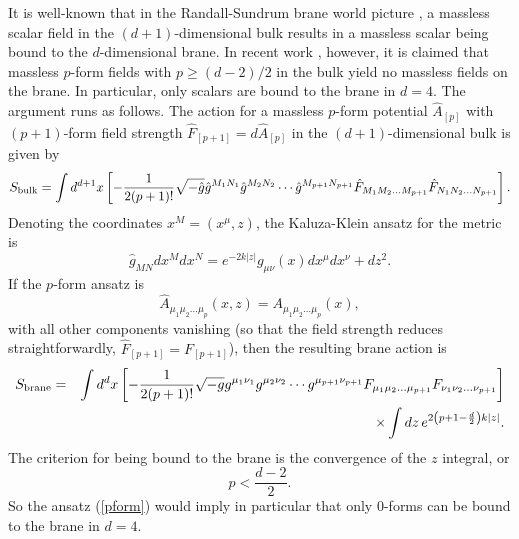\documentclass[a4paper,12pt]{article}
\begin{document}
It is well-known that in the Randall-Sundrum brane world picture
\cite{Randall}, a massless scalar field in the $(d+1)$-dimensional
bulk results in a massless scalar being bound to the $d$-dimensional
brane.  In recent work \cite{kaloper}, however, it is claimed
that massless $p$-form fields with $p \geq (d-2)/2$ in the bulk yield no
massless fields on the brane. In particular, only scalars are bound
to the brane in $d=4$. The argument runs as follows. The action for
a massless $p$-form potential $\hat A_{[p]}$ with $(p+1)$-form field
strength $\hat F_{[p+1]}=d \hat A_{[p]}$ in the $(d+1)$-dimensional
bulk is given by
%
\begin{equation}
S_{\rm bulk}=\int d^{d+1}x
\left[-\frac{1}{2(p+1)!}\sqrt{-\hat g}\hat g^{M_{1}N_{1}}
\hat g^{M_{2}N_{2}}\cdots \hat g^{M_{p+1}N_{p+1}}
\hat F_{M_{1}M_{2}\ldots M_{p+1}}
\hat F_{N_{1}N_{2}\ldots N_{p+1}}\right].
\label{bulkaction}
\end{equation}
%
Denoting the coordinates $x^{M}=(x^{\mu},z)$, the Kaluza-Klein ansatz
for the metric is
%
\begin{equation}
\hat g_{MN}dx^{M}dx^{N}=e^{-2k|z|}g_{\mu\nu}(x)dx^{\mu}dx^{\nu}+dz^{2}.
\label{metric}
\end{equation}
%
If the $p$-form ansatz is
%
\begin{equation}
\hat A_{\mu_{1}\mu_{2}\ldots\mu_{p}}(x,z)
=A_{\mu_{1}\mu_{2}\ldots\mu_{p}}(x),
\label{pform}
\end{equation}
%
with all other components vanishing (so that the field
strength reduces straightforwardly, $\hat F_{[p+1]} = F_{[p+1]}$),
then the resulting brane action is
%
\begin{eqnarray}
S_{\rm brane}&=&\int d^{d}x
\left[-\frac{1}{2(p+1)!}\sqrt{-g}g^{\mu_{1}\nu_{1}}g^{\mu_{2}\nu_{2}}\cdots
g^{\mu_{p+1}\nu_{p+1}} F_{\mu_{1}\mu_{2}\ldots \mu_{p+1}}
F_{\nu_{1} \nu_{2} \ldots \nu_{p+1}}\right]\nonumber\\
&&\kern8em\times \int dz\, e^{2\left(p+1-\frac{d}{2}\right) k|z|}.
\label{braneaction}
\end{eqnarray}
%
The criterion for being bound to the brane is the convergence of the
$z$ integral, or
%
\begin{equation}
p<\frac{d-2}{2}.
\label{converge}
\end{equation}
%
So the ansatz (\ref{pform}) would imply in particular that only $0$-forms
can be bound to the brane in $d=4$.
\end{document}
